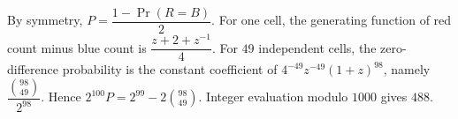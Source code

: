 By symmetry, $P=\dfrac{1-\Pr(R=B)}{2}$. For one cell, the generating function of red count minus blue count is $\dfrac{z+2+z^{-1}}{4}$. For $49$ independent cells, the zero-difference probability is the constant coefficient of $4^{-49}z^{-49}(1+z)^{98}$, namely $\dfrac{\binom{98}{49}}{2^{98}}$. Hence $2^{100}P=2^{99}-2\binom{98}{49}$. Integer evaluation modulo $1000$ gives $\boxed{488}$.
